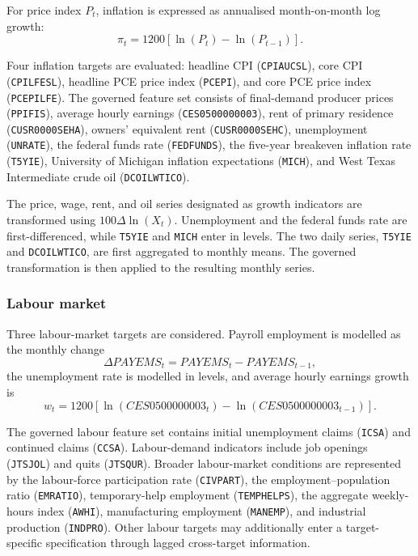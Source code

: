 For price index $P_t$, inflation is expressed as annualised month-on-month log
growth:
\begin{equation}
    \pi_t
    =
    1200
    \left[
        \ln(P_t)-\ln(P_{t-1})
    \right].
    \label{eq:inflation_growth}
\end{equation}

Four inflation targets are evaluated: headline CPI
(\texttt{CPIAUCSL}), core CPI (\texttt{CPILFESL}), headline PCE price index
(\texttt{PCEPI}), and core PCE price index (\texttt{PCEPILFE}). The governed
feature set consists of final-demand producer prices (\texttt{PPIFIS}),
average hourly earnings (\texttt{CES0500000003}), rent of primary residence
(\texttt{CUSR0000SEHA}), owners' equivalent rent
(\texttt{CUSR0000SEHC}), unemployment (\texttt{UNRATE}), the federal funds
rate (\texttt{FEDFUNDS}), the five-year breakeven inflation rate
(\texttt{T5YIE}), University of Michigan inflation expectations
(\texttt{MICH}), and West Texas Intermediate crude oil
(\texttt{DCOILWTICO}).

The price, wage, rent, and oil series designated as growth indicators are
transformed using $100\Delta\ln(X_t)$. Unemployment and the federal funds rate
are first-differenced, while \texttt{T5YIE} and \texttt{MICH} enter in
levels. The two daily series, \texttt{T5YIE} and \texttt{DCOILWTICO}, are
first aggregated to monthly means. The governed transformation is then
applied to the resulting monthly series.

\subsubsection{Labour market}
\label{subsec:labour_data}

Three labour-market targets are considered. Payroll employment is modelled as
the monthly change
\begin{equation}
    \Delta PAYEMS_t
    =
    PAYEMS_t-PAYEMS_{t-1},
    \label{eq:payems_change}
\end{equation}
the unemployment rate is modelled in levels, and average hourly earnings
growth is
\begin{equation}
    w_t
    =
    1200
    \left[
        \ln(CES0500000003_t)
        -
        \ln(CES0500000003_{t-1})
    \right].
    \label{eq:ahe_growth}
\end{equation}

The governed labour feature set contains initial unemployment claims
(\texttt{ICSA}) and continued claims (\texttt{CCSA}). Labour-demand
indicators include job openings (\texttt{JTSJOL}) and quits
(\texttt{JTSQUR}). Broader labour-market conditions are represented by the
labour-force participation rate (\texttt{CIVPART}), the employment--population
ratio (\texttt{EMRATIO}), temporary-help employment (\texttt{TEMPHELPS}),
the aggregate weekly-hours index (\texttt{AWHI}), manufacturing employment
(\texttt{MANEMP}), and industrial production (\texttt{INDPRO}). Other labour
targets may additionally enter a target-specific specification through lagged
cross-target information.

